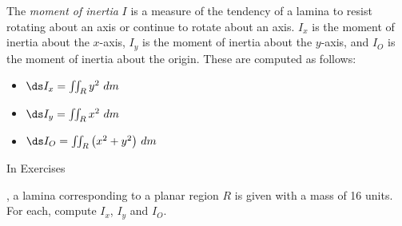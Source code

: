 \begin{exerciseset}{The \textit{moment of inertia} $I$ is a measure of the tendency of a lamina to resist rotating about an axis or continue to rotate about an axis. $I_x$ is the moment of inertia about the $x$-axis, $I_y$ is the moment of inertia about the $y$-axis, and $I_O$ is the moment of inertia about the origin. These are computed as follows:
\begin{itemize}
	\item $\ds I_x = \iint_R y^2\ dm$
	\item	$\ds I_y = \iint_R x^2\ dm$
	\item	$\ds I_O = \iint_R \big(x^2+y^2\big)\ dm$
\end{itemize} \noindent In Exercises} 
{,  a lamina corresponding to a planar region $R$ is given with a mass of 16 units. For each, compute $I_x$, $I_y$ and $I_O$.}





\end{exerciseset}
